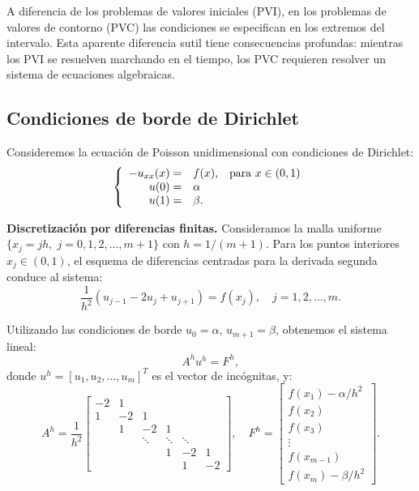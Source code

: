 \documentclass[a4paper,11pt]{report}
\begin{document}
A diferencia de los problemas de valores iniciales (PVI), en los problemas de valores de contorno (PVC) las condiciones se especifican en los extremos del intervalo. Esta aparente diferencia sutil tiene consecuencias profundas: mientras los PVI se resuelven marchando en el tiempo, los PVC requieren resolver un sistema de ecuaciones algebraicas.

\subsection{Condiciones de borde de Dirichlet}

Consideremos la ecuación de Poisson unidimensional con condiciones de Dirichlet:
\begin{equation}
\label{laplaciano_dirichlet}
\left\lbrace
  \begin{array}{r l c}
      -u_{xx}(x) = & f(x), & \mbox{para } x \in (0,1) \\
      u(0) = & \alpha & \\
      u(1) = & \beta. &
      \end{array}
    \right.
\end{equation}

\textbf{Discretización por diferencias finitas.} Consideramos la malla uniforme $\{ x_j = jh, \; j=0,1,2,\ldots, m+1 \}$ con $h=1/(m+1)$.
Para los puntos interiores $x_j \in (0,1)$, el esquema de diferencias centradas para 
la derivada segunda conduce al sistema:
\[
\frac{1}{h^2} \left( u_{j-1} - 2u_{j} + u_{j+1} \right) = f(x_j), \quad j=1,2,\ldots,m.
\]

Utilizando las condiciones de borde $u_0 = \alpha$, $u_{m+1}=\beta$, obtenemos el sistema lineal:
\begin{equation}\label{sistema_pvc}
A^h u^h = F^h,
\end{equation}
donde $u^h=[u_1,u_2,\ldots,u_m]^T$ es el vector de incógnitas, y:
\begin{equation} \label{matriz_Ah}
A^h= \frac{1}{h^2} \left[
\begin{array}{ccccccc}
-2 & 1 & & & & \\
 1 & -2 & 1 &  & & \\
   & 1 & -2 & 1 & &  \\
 & &\ddots & \ddots & \ddots & \\ 
& & & 1 & -2 & 1 \\
& & &  & 1 & -2
\end{array}
\right], \quad 
F^h=
\left[
\begin{array}{c}
f(x_1)-\alpha/h^2 \\
f(x_2) \\
f(x_3) \\
\vdots \\ 
f(x_{m-1}) \\
f(x_{m}) - \beta/h^2
\end{array}
\right].
\end{equation}
\end{document}
